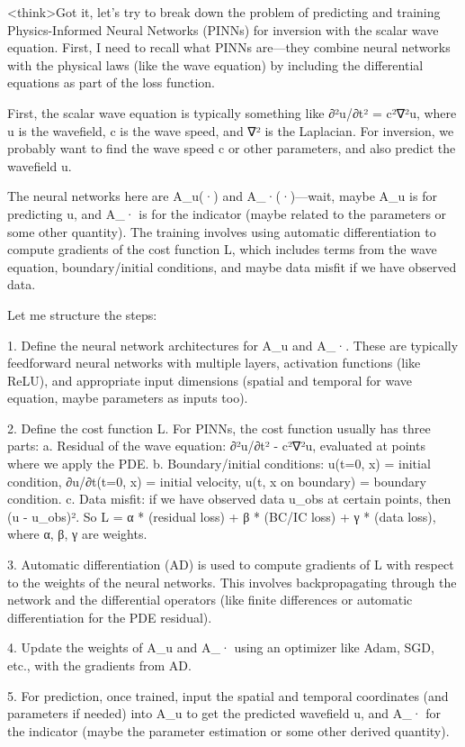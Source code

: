 <think>Got it, let's try to break down the problem of predicting and training Physics-Informed Neural Networks (PINNs) for inversion with the scalar wave equation. First, I need to recall what PINNs are—they combine neural networks with the physical laws (like the wave equation) by including the differential equations as part of the loss function. 

First, the scalar wave equation is typically something like ∂²u/∂t² = c²∇²u, where u is the wavefield, c is the wave speed, and ∇² is the Laplacian. For inversion, we probably want to find the wave speed c or other parameters, and also predict the wavefield u. 

The neural networks here are A_u(·) and A_·(·)—wait, maybe A_u is for predicting u, and A_· is for the indicator (maybe related to the parameters or some other quantity). The training involves using automatic differentiation to compute gradients of the cost function L, which includes terms from the wave equation, boundary/initial conditions, and maybe data misfit if we have observed data. 

Let me structure the steps:

1. Define the neural network architectures for A_u and A_·. These are typically feedforward neural networks with multiple layers, activation functions (like ReLU), and appropriate input dimensions (spatial and temporal for wave equation, maybe parameters as inputs too).

2. Define the cost function L. For PINNs, the cost function usually has three parts: 
   a. Residual of the wave equation: ∂²u/∂t² - c²∇²u, evaluated at points where we apply the PDE. 
   b. Boundary/initial conditions: u(t=0, x) = initial condition, ∂u/∂t(t=0, x) = initial velocity, u(t, x on boundary) = boundary condition. 
   c. Data misfit: if we have observed data u_obs at certain points, then (u - u_obs)². 
   So L = α * (residual loss) + β * (BC/IC loss) + γ * (data loss), where α, β, γ are weights.

3. Automatic differentiation (AD) is used to compute gradients of L with respect to the weights of the neural networks. This involves backpropagating through the network and the differential operators (like finite differences or automatic differentiation for the PDE residual).

4. Update the weights of A_u and A_· using an optimizer like Adam, SGD, etc., with the gradients from AD.

5. For prediction, once trained, input the spatial and temporal coordinates (and parameters if needed) into A_u to get the predicted wavefield u, and A_· for the indicator (maybe the parameter estimation or some other derived quantity).

